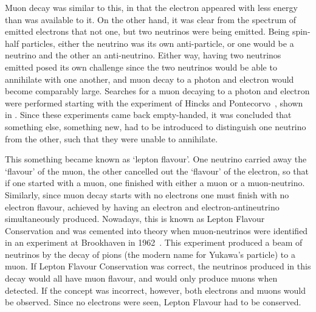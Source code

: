 
Muon decay was similar to this, in that the electron appeared with less energy than was available to it.
On the other hand, it was clear from the spectrum of emitted electrons that not one, but two neutrinos were being emitted.
Being spin-half particles, either the neutrino was its own anti-particle, or one would be a neutrino and the other an anti-neutrino.
Either way, having two neutrinos emitted posed its own challenge since the two neutrinos would be able to annihilate with one another, and muon decay to a photon and electron would become comparably large.
Searches for a muon decaying to a photon and electron were performed starting with the experiment of Hincks and Pontecorvo~\cite{Hincks194802}, shown in .
Since these experiments came back empty-handed, it was concluded that something else, something new, had to be introduced to distinguish one neutrino from the other, such that they were unable to annihilate.
\FigTheoryHincksPontecorvoMuEGamma

This something became known as 	`lepton flavour'.  
One neutrino carried away the `flavour' of the muon, the other cancelled out the `flavour' of the electron, so that if one started with a muon, one finished with either a muon or a muon-neutrino.
Similarly, since muon decay starts with no electrons one must finish with no electron flavour, achieved by having an electron and electron-antineutrino simultaneously produced.
Nowadays, this is known as Lepton Flavour Conservation and was cemented into theory when muon-neutrinos were identified in an experiment at Brookhaven in 1962~\cite{MuNeutrinoDiscovery}.
This experiment produced a beam of neutrinos by the decay of pions (the modern name for Yukawa's particle) to a muon.
If Lepton Flavour Conservation was correct, the neutrinos produced in this decay would all have muon flavour, and would only produce muons when detected.
If the concept was incorrect, however, both electrons and muons would be observed.
Since no electrons were seen, Lepton Flavour had to be conserved.


